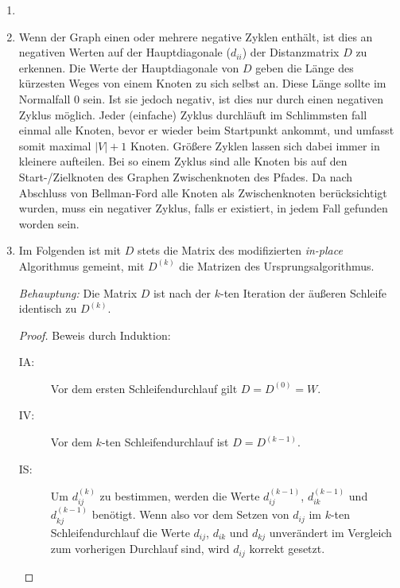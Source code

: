 \documentclass[11pt,a4paper]{article}
\begin{document}
\begin{loesung}
    \begin{enumerate}
        \item 
        \item
        Wenn der Graph einen oder mehrere negative Zyklen enthält, ist dies an negativen Werten auf der Hauptdiagonale ($d_{ii}$) der Distanzmatrix $D$ zu erkennen.
        Die Werte der Hauptdiagonale von $D$ geben die Länge des kürzesten Weges von einem Knoten zu sich selbst an.
        Diese Länge sollte im Normalfall 0 sein.
        Ist sie jedoch negativ, ist dies nur durch einen negativen Zyklus möglich.
        Jeder (einfache) Zyklus durchläuft im Schlimmsten fall einmal alle Knoten, bevor er wieder beim Startpunkt ankommt, und umfasst somit maximal $|V|+1$ Knoten.
        Größere Zyklen lassen sich dabei immer in kleinere aufteilen.
        Bei so einem  Zyklus sind alle Knoten bis auf den Start-/Zielknoten des Graphen Zwischenknoten des Pfades.
        Da nach Abschluss von Bellman-Ford alle Knoten als Zwischenknoten berücksichtigt wurden, muss ein negativer Zyklus, falls er existiert, in jedem Fall gefunden worden sein.
        \item
        Im Folgenden ist mit $D$ stets die Matrix des modifizierten \emph{in-place} Algorithmus gemeint, mit $D^{(k)}$ die Matrizen des Ursprungsalgorithmus.

        \emph{Behauptung:} Die Matrix $D$ ist nach der $k$-ten Iteration der äußeren Schleife identisch zu $D^{(k)}$.
        \begin{proof}
            Beweis durch Induktion:
            \begin{description}
                \item[IA:] Vor dem ersten Schleifendurchlauf gilt $D = D^{(0)} = W$.
                \item[IV:] Vor dem $k$-ten Schleifendurchlauf ist $D = D^{(k - 1)}$.
                \item[IS:] Um $d_{ij}^{(k)}$ zu bestimmen, werden die Werte $d_{ij}^{(k - 1)}$, $d_{ik}^{(k - 1)}$ und $d_{kj}^{(k - 1)}$ benötigt.
                Wenn also vor dem Setzen von $d_{ij}$ im $k$-ten Schleifendurchlauf die Werte $d_{ij}$, $d_{ik}$ und $d_{kj}$ unverändert im Vergleich zum vorherigen Durchlauf sind, wird $d_{ij}$ korrekt gesetzt.


\end{description}
\end{proof}
\end{enumerate}
\end{loesung}
\end{document}
